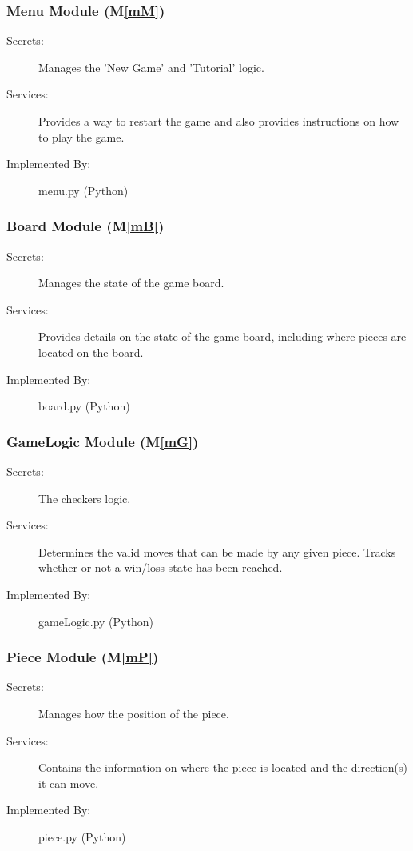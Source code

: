 \documentclass[12pt, titlepage]{article}
\newcommand{\mref}[1]{M\ref{#1}}
\begin{document}
\subsubsection{Menu Module (\mref{mM})}

\begin{description}
\item[Secrets:] Manages the 'New Game' and 'Tutorial' logic.
\item[Services:] Provides a way to restart the game and also provides instructions on how to play the game.
\item[Implemented By:] menu.py (Python)
\end{description}

\subsubsection{Board Module (\mref{mB})}

\begin{description}
\item[Secrets:] Manages the state of the game board.
\item[Services:] Provides details on the state of the game board, including where pieces are located on the board.
\item[Implemented By:] board.py (Python)
\end{description}

\subsubsection{GameLogic Module (\mref{mG})}

\begin{description}
\item[Secrets:] The checkers logic.
\item[Services:] Determines the valid moves that can be made by any given piece. Tracks whether or not a win/loss state has been reached.
\item[Implemented By:] gameLogic.py (Python)
\end{description}

\subsubsection{Piece Module (\mref{mP})}

\begin{description}
\item[Secrets:] Manages how the position of the piece.
\item[Services:] Contains the information on where the piece is located and the direction(s) it can move.
\item[Implemented By:] piece.py (Python)
\end{description}
\end{document}
